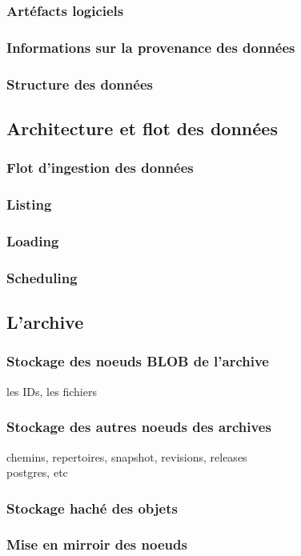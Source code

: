 \documentclass[12pt,a4paper]{report}
\begin{document}
		\subsubsection{Artéfacts logiciels}
		\subsubsection{Informations sur la provenance des données}
		\subsubsection{Structure des données}
	\subsection{Architecture et flot des données}
		\subsubsection{Flot d'ingestion des données}
		\subsubsection{Listing}
		\subsubsection{Loading}
		\subsubsection{Scheduling}
	\subsection{L'archive}
		\subsubsection{Stockage des noeuds BLOB de l'archive}
				les IDs, les fichiers
		\subsubsection{Stockage des autres noeuds des archives}
				chemins, repertoires, snapshot, revisions, releases\\				
				postgres, etc
		\subsubsection{Stockage haché des objets}
		\subsubsection{Mise en mirroir des noeuds}
\end{document}
